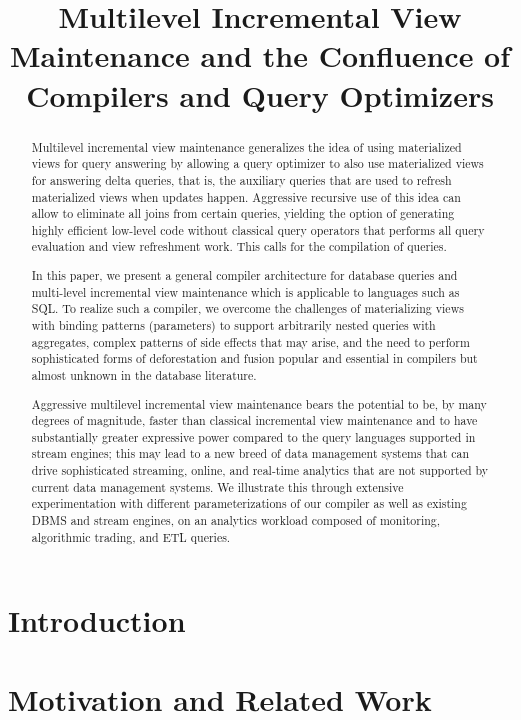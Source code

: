 \documentclass{sig-alternate}
\title{Multilevel Incremental View Maintenance and the Confluence of
Compilers and Query Optimizers}
\author{
}
\begin{document}
\maketitle


\begin{abstract}
Multilevel incremental view maintenance generalizes the idea of using materialized views for query answering by allowing a query optimizer to also use materialized views for answering delta queries, that is, the auxiliary queries that are used to refresh materialized views when updates happen. Aggressive recursive use of this idea can allow to eliminate all joins from certain queries, yielding the option of generating highly efficient low-level code without classical query operators that performs all query evaluation and view refreshment work. This calls for the compilation of queries.

In this paper, we present a general compiler architecture for database queries and multi-level incremental view maintenance which is applicable to languages such as SQL. To realize such a compiler, we overcome the challenges of materializing views with binding patterns (parameters) to support arbitrarily nested queries with aggregates, complex patterns of side effects that may arise, and the need to perform sophisticated forms of deforestation and fusion popular and essential in compilers but almost unknown in the database literature.

Aggressive multilevel incremental view maintenance bears the potential to be, by many degrees of magnitude, faster than classical incremental view maintenance and to have substantially greater expressive power compared to the query languages supported in stream engines; this may lead to a new breed of data management systems that can drive sophisticated streaming, online, and real-time analytics that are not supported by current data management systems.
We illustrate this through extensive experimentation with different parameterizations of our compiler as well as existing DBMS and stream engines, on an analytics workload composed of monitoring, algorithmic trading, and ETL queries. 
\end{abstract}


\section{Introduction}
\label{sec:introduction}


\section{Motivation and Related Work}
\label{sec:dbfail}

\end{document}
